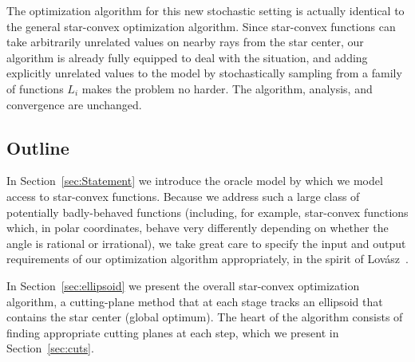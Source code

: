 \documentclass[11pt,letter]{article}
\numberwithin{nTheorems}{section}
\begin{document}
The optimization algorithm for this new stochastic setting is actually identical to the general star-convex optimization algorithm. Since star-convex functions can take arbitrarily unrelated values on nearby rays from the star center, our algorithm is already fully equipped to deal with the situation, and adding explicitly unrelated values to the model by stochastically sampling from a family of functions $L_i$ makes the problem no harder. The algorithm, analysis, and convergence are unchanged.


\subsection{Outline}
In Section~\ref{sec:Statement} we introduce the oracle model by which we model access to star-convex functions. Because we address such a large class of potentially badly-behaved functions (including, for example, star-convex functions which, in polar coordinates, behave very differently depending on whether the angle is rational or irrational), we take great care to specify the input and output requirements of our optimization algorithm appropriately, in the spirit of Lov\'{a}sz~\cite{Lovasz:1987}.

In Section~\ref{sec:ellipsoid} we present the overall star-convex optimization algorithm, a cutting-plane method that at each stage tracks an ellipsoid that contains the star center (global optimum). The heart of the algorithm consists of finding appropriate cutting planes at each step, which we present in Section~\ref{sec:cuts}.
\end{document}
